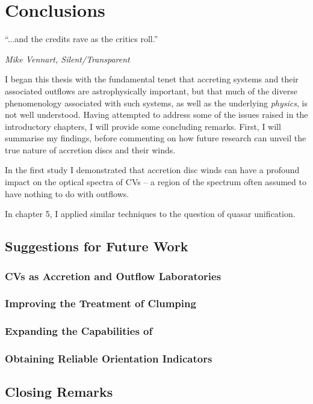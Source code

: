 \chapter{Conclusions}

\epigraph{``...and the credits rave as the critics roll.''}
{{\sl Mike Vennart, Silent/Transparent}}

I began this thesis with the fundamental tenet that accreting systems
and their associated outflows are astrophysically important, but that
much of the diverse phenomenology associated with such systems, as well
as the underlying {\em physics}, is not well understood.  
Having attempted to address some of the issues raised in the 
introductory chapters, I will provide some concluding remarks. 
First, I will summarise my findings, before 
commenting on how future research can unveil the true nature of 
accretion discs and their winds.

In the first study I demonstrated that accretion disc winds
can have a profound impact on the optical spectra of CVs -- a region
of the spectrum often assumed to have nothing to do with outflows.

In chapter 5, I applied similar techniques to the question of quasar 
unification.

\section{Suggestions for Future Work}

\subsection{CVs as Accretion and Outflow Laboratories}

\subsection{Improving the Treatment of Clumping}

\subsection{Expanding the Capabilities of \py}

\subsection{Obtaining Reliable Orientation Indicators}

\section{Closing Remarks}












